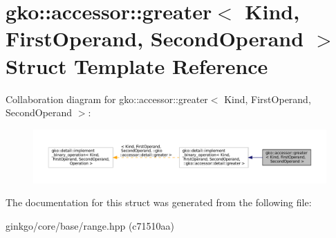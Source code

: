 \hypertarget{structgko_1_1accessor_1_1greater}{}\section{gko\+:\+:accessor\+:\+:greater$<$ Kind, First\+Operand, Second\+Operand $>$ Struct Template Reference}
\label{structgko_1_1accessor_1_1greater}


Collaboration diagram for gko\+:\+:accessor\+:\+:greater$<$ Kind, First\+Operand, Second\+Operand $>$\+:
\nopagebreak
\begin{figure}[H]
\begin{center}
\leavevmode
\includegraphics[width=350pt]{structgko_1_1accessor_1_1greater__coll__graph}
\end{center}
\end{figure}


The documentation for this struct was generated from the following file\+:\begin{DoxyCompactItemize}
\item 
ginkgo/core/base/range.\+hpp (c71510aa)\end{DoxyCompactItemize}
